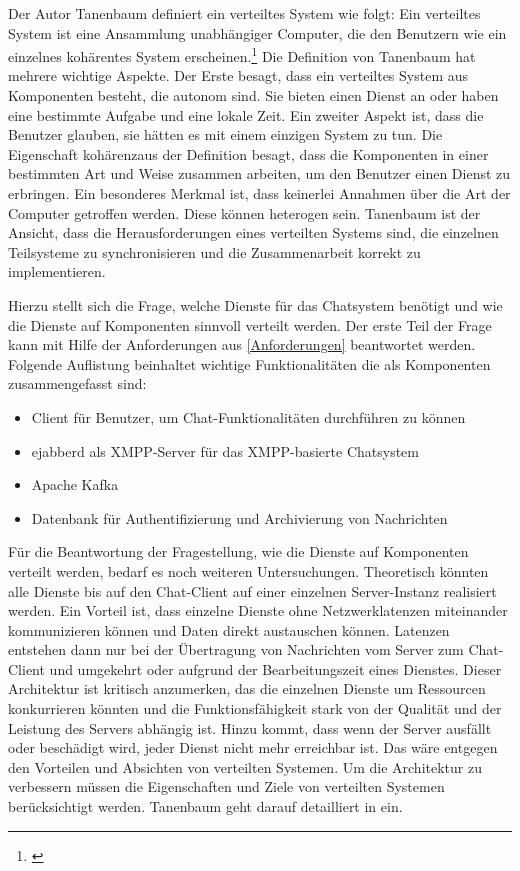\documentclass[a4paper,titlepage,halfparskip,12pt]{scrreprt}
\begin{document}
\begin{onehalfspacing}
Der Autor Tanenbaum definiert ein verteiltes System wie folgt: \glqq Ein verteiltes System ist eine Ansammlung unabhängiger Computer, die den Benutzern wie ein einzelnes kohärentes System erscheinen.\grqq \footnote{\cite[S.19]{andrew2008verteilte}} Die Definition von Tanenbaum hat mehrere wichtige Aspekte. Der Erste besagt, dass ein verteiltes System aus Komponenten besteht, die autonom sind. Sie bieten einen Dienst an oder haben eine bestimmte Aufgabe und eine lokale Zeit. Ein zweiter Aspekt ist, dass die Benutzer glauben, sie hätten es mit einem einzigen System zu tun. Die Eigenschaft \glqq kohärenz\grqq aus der Definition besagt, dass die Komponenten in einer bestimmten Art und Weise zusammen arbeiten, um den Benutzer einen Dienst zu erbringen. Ein besonderes Merkmal ist, dass keinerlei Annahmen über die Art der Computer getroffen werden. Diese können heterogen sein. Tanenbaum \cite{andrew2008verteilte} ist der Ansicht, dass die Herausforderungen eines verteilten Systems sind, die einzelnen Teilsysteme zu synchronisieren und die Zusammenarbeit korrekt zu implementieren.

Hierzu stellt sich die Frage, welche Dienste für das Chatsystem benötigt und wie die Dienste auf Komponenten sinnvoll verteilt werden. Der erste Teil der Frage kann mit Hilfe der Anforderungen aus \autoref{Anforderungen} beantwortet werden. Folgende Auflistung beinhaltet wichtige Funktionalitäten die als Komponenten zusammengefasst sind:

\begin{itemize}
\item Client für Benutzer, um Chat-Funktionalitäten durchführen zu können
\item ejabberd als \ac{XMPP}-Server für das \ac{XMPP}-basierte Chatsystem
\item Apache Kafka
\item Datenbank für Authentifizierung und Archivierung von Nachrichten
\end{itemize}

\newpage

Für die Beantwortung der Fragestellung, wie die Dienste auf Komponenten verteilt werden, bedarf es noch weiteren Untersuchungen. Theoretisch könnten alle Dienste bis auf den Chat-Client auf einer einzelnen Server-Instanz realisiert werden. Ein Vorteil ist, dass einzelne Dienste ohne Netzwerklatenzen miteinander kommunizieren können und Daten direkt austauschen können. Latenzen entstehen dann nur bei der Übertragung von Nachrichten vom Server zum Chat-Client und umgekehrt oder aufgrund der Bearbeitungszeit eines Dienstes. Dieser Architektur ist kritisch anzumerken, das die einzelnen Dienste um Ressourcen konkurrieren könnten und die Funktionsfähigkeit stark von der Qualität und der Leistung des Servers abhängig ist. Hinzu kommt, dass wenn der Server ausfällt oder beschädigt wird, jeder Dienst nicht mehr erreichbar ist. Das wäre entgegen den Vorteilen und Absichten von verteilten Systemen. Um die Architektur zu verbessern müssen die Eigenschaften und Ziele von verteilten Systemen berücksichtigt werden. Tanenbaum geht darauf detailliert in \cite{andrew2008verteilte} ein.


\end{onehalfspacing}
\end{document}
